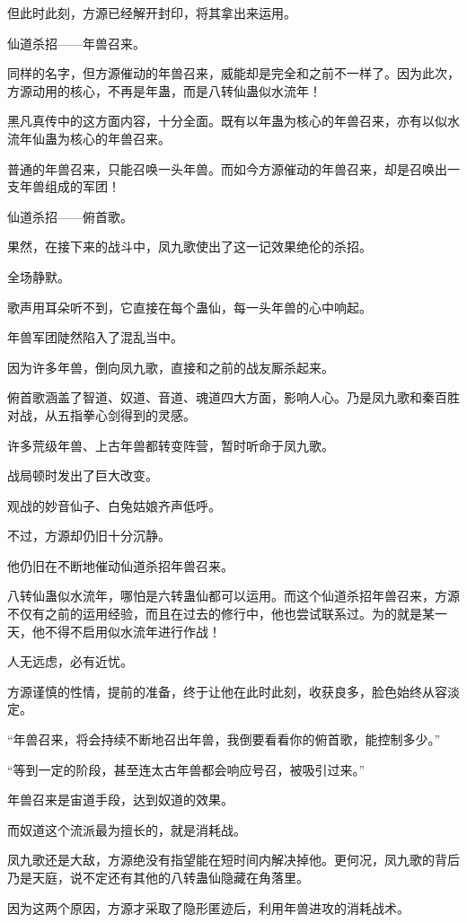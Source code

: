 \begin{this_body}
但此时此刻，方源已经解开封印，将其拿出来运用。

仙道杀招——年兽召来。

同样的名字，但方源催动的年兽召来，威能却是完全和之前不一样了。因为此次，方源动用的核心，不再是年蛊，而是八转仙蛊似水流年！

黑凡真传中的这方面内容，十分全面。既有以年蛊为核心的年兽召来，亦有以似水流年仙蛊为核心的年兽召来。

普通的年兽召来，只能召唤一头年兽。而如今方源催动的年兽召来，却是召唤出一支年兽组成的军团！

仙道杀招——俯首歌。

果然，在接下来的战斗中，凤九歌使出了这一记效果绝伦的杀招。

全场静默。

歌声用耳朵听不到，它直接在每个蛊仙，每一头年兽的心中响起。

年兽军团陡然陷入了混乱当中。

因为许多年兽，倒向凤九歌，直接和之前的战友厮杀起来。

俯首歌涵盖了智道、奴道、音道、魂道四大方面，影响人心。乃是凤九歌和秦百胜对战，从五指拳心剑得到的灵感。

许多荒级年兽、上古年兽都转变阵营，暂时听命于凤九歌。

战局顿时发出了巨大改变。

观战的妙音仙子、白兔姑娘齐声低呼。

不过，方源却仍旧十分沉静。

他仍旧在不断地催动仙道杀招年兽召来。

八转仙蛊似水流年，哪怕是六转蛊仙都可以运用。而这个仙道杀招年兽召来，方源不仅有之前的运用经验，而且在过去的修行中，他也尝试联系过。为的就是某一天，他不得不启用似水流年进行作战！

人无远虑，必有近忧。

方源谨慎的性情，提前的准备，终于让他在此时此刻，收获良多，脸色始终从容淡定。

“年兽召来，将会持续不断地召出年兽，我倒要看看你的俯首歌，能控制多少。”

“等到一定的阶段，甚至连太古年兽都会响应号召，被吸引过来。”

年兽召来是宙道手段，达到奴道的效果。

而奴道这个流派最为擅长的，就是消耗战。

凤九歌还是大敌，方源绝没有指望能在短时间内解决掉他。更何况，凤九歌的背后乃是天庭，说不定还有其他的八转蛊仙隐藏在角落里。

因为这两个原因，方源才采取了隐形匿迹后，利用年兽进攻的消耗战术。


\end{this_body}
